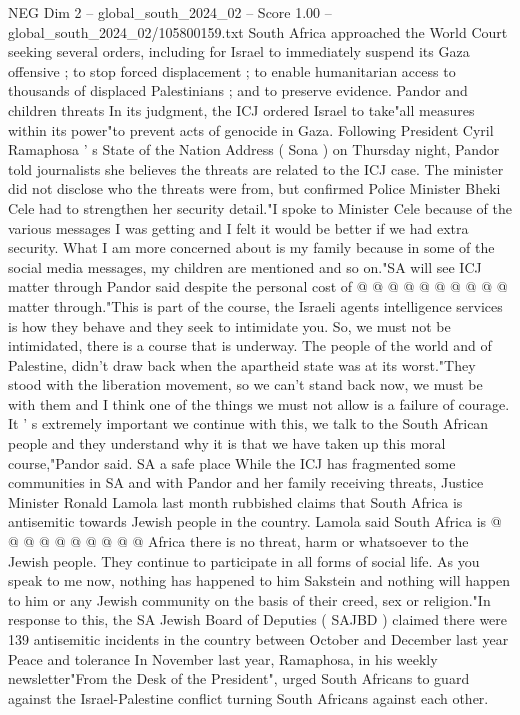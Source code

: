 \begin{textsample}{NEG Dim 2 – global\_south\_2024\_02 – Score 1.00 – global\_south\_2024\_02/105800159.txt}  \label{ex:f2_neg_244}
South Africa approached the World Court seeking several orders, including for Israel to immediately suspend its Gaza offensive ; to stop forced displacement ; to enable humanitarian access to thousands of displaced Palestinians ; and to preserve evidence.
Pandor and children threats In its judgment, the ICJ ordered Israel to take"all measures within its power"to prevent acts of genocide in Gaza.
Following President Cyril Ramaphosa ' s State of the Nation Address ( Sona ) on Thursday night, Pandor told journalists she believes the threats are related to the ICJ case.
The minister did not disclose who the threats were from, but confirmed Police Minister Bheki Cele had to strengthen her security detail."I spoke to Minister Cele because of the various messages I was getting and I felt it would be better if we had extra security.
What I am more concerned about is my family because in some of the social media messages, my children are mentioned and so on."SA will see ICJ matter through Pandor said despite the personal cost of @ @ @ @ @ @ @ @ @ @ matter through."This is part of the course, the Israeli agents intelligence services is how they behave and they seek to intimidate you.
So, we must not be intimidated, there is a course that is underway.
The people of the world and of Palestine, didn't draw back when the apartheid state was at its worst."They stood with the liberation movement, so we can't stand back now, we must be with them and I think one of the things we must not allow is a failure of courage.
It ' s extremely important we continue with this, we talk to the South African people and they understand why it is that we have taken up this moral course,"Pandor said.
SA a safe place While the ICJ has fragmented some communities in SA and with Pandor and her family receiving threats, Justice Minister Ronald Lamola last month rubbished claims that South Africa is antisemitic towards Jewish people in the country.
Lamola said South Africa is @ @ @ @ @ @ @ @ @ @ Africa there is no threat, harm or whatsoever to the Jewish people.
They continue to participate in all forms of social life.
As you speak to me now, nothing has happened to him Sakstein and nothing will happen to him or any Jewish community on the basis of their creed, sex or religion."In response to this, the SA Jewish Board of Deputies ( SAJBD ) claimed there were 139 antisemitic incidents in the country between October and December last year Peace and tolerance In November last year, Ramaphosa, in his weekly newsletter"From the Desk of the President", urged South Africans to guard against the Israel-Palestine conflict turning South Africans against each other.

\end{textsample}
